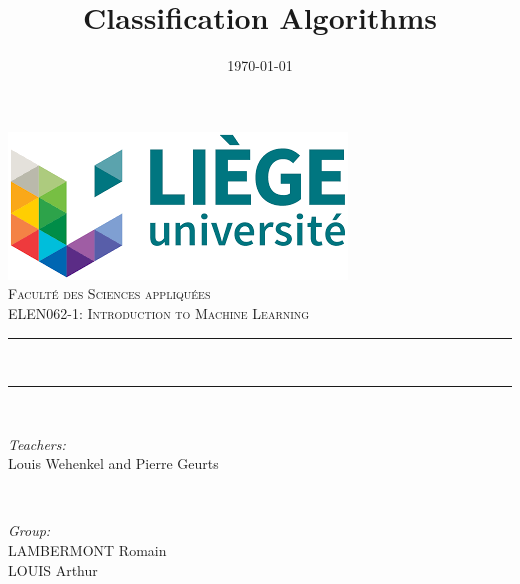 \documentclass[12pt]{article}
\title{Classification Algorithms}							%
\date{\today}											%
\makeatletter
\let\thetitle\@title
\let\thedate\@date
\makeatother
\begin{document}

\begin{titlepage}
	\centering
    \includegraphics[scale = 0.7]{img/University.png}\\[1.0 cm]	%
    \textsc{\LARGE \newline\newline Faculté des Sciences appliquées}\\	%
	\textsc{\Large  ELEN062-1: Introduction to Machine Learning}\\[0.5 cm]	%
	\rule{\linewidth}{0.2 mm} \\[0.4 cm]
	{\huge \bfseries \thetitle}
	\rule{\linewidth}{0.2 mm} \\[2 cm]
	
	\begin{minipage}{0.5\textwidth}
		\begin{flushleft} \large
			\emph{Teachers:}\\
			Louis Wehenkel and Pierre Geurts\\
			\end{flushleft}
			\end{minipage}~
			\begin{minipage}{0.4\textwidth}
            
			\begin{flushright} \large
			\emph{Group:} \\
			LAMBERMONT Romain\\
            LOUIS Arthur\\
		\end{flushright}
        
	\end{minipage}\\[5 cm]
	
	
    \thedate
	
\end{titlepage}

\thispagestyle{empty}
\pagebreak
\setcounter{page}{1}
\end{document}
